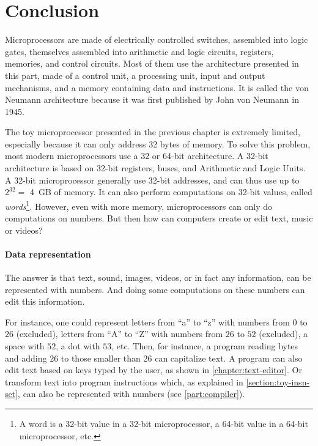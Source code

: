 
\chapter*{Conclusion}

Microprocessors are made of electrically controlled switches, assembled into
logic gates, themselves assembled into arithmetic and logic circuits,
registers, memories, and control circuits. Most of them use the architecture
presented in this part, made of a control unit, a processing unit, input and
output mechanisms, and a memory containing data and instructions. It is called
the von Neumann architecture because it was first published by John von Neumann
in 1945.

The toy microprocessor presented in the previous chapter is extremely limited,
especially because it can only address 32 bytes of memory. To solve this
problem, most modern microprocessors use a 32 or 64-bit architecture. A 32-bit
architecture is based on 32-bit registers, buses, and Arithmetic and Logic
Units. A 32-bit microprocessor generally use 32-bit addresses, and can thus use
up to $2^{32} =$ 4~GB of memory. It can also perform computations on 32-bit
values, called {\em words}\footnote{A word is a 32-bit value in a 32-bit
microprocessor, a 64-bit value in a 64-bit microprocessor, etc.}. However, even
with more memory, microprocessors can only do computations on numbers. But then
how can computers create or edit text, music or videos?

\subsubsection{Data representation}

The answer is that text, sound, images, videos, or in fact any information, can
be represented with numbers. And doing some computations on these numbers can
edit this information.

For instance, one could represent letters from ``a'' to ``z'' with numbers from
$0$ to $26$ (excluded), letters from ``A'' to ``Z'' with numbers from $26$ to
$52$ (excluded), a space with $52$, a dot with $53$, etc. Then, for instance, a
program reading bytes and adding $26$ to those smaller than $26$ can
capitalize text. A program can also edit text based on keys typed by the user,
as shown in \cref{chapter:text-editor}. Or transform text into program
instructions which, as explained in \cref{section:toy-insn-set}, can also be
represented with numbers (see \cref{part:compiler}).


